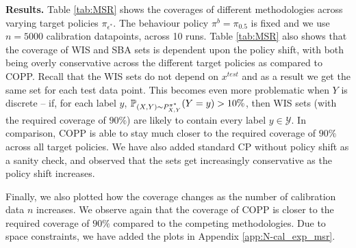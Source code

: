 \textbf{Results.}
Table \ref{tab:MSR} shows the coverages of different methodologies across varying target policies $\pi_{\epsilon^*}$. The behaviour policy $\pi^b = \pi_{0.5}$ is fixed and we use $n=5000$ calibration datapoints, across 10 runs. Table \ref{tab:MSR} also shows that the coverage of WIS and SBA sets is dependent upon the policy shift, with both being overly conservative across the different target policies as compared to COPP. Recall that the WIS sets do not depend on $x^{test}$ and as a result we get the same set for each test data point. This becomes even more problematic when $Y$ is discrete -- if, for each label $y$, $\mathbb{P}_{(X,Y)\sim P^{\pi^*}_{X,Y}}(Y = y)>10\%$, then WIS sets (with the required coverage of $90\%$) are likely to contain every label $y \in \mathcal{Y}$.
In comparison, COPP is able to stay much closer to the required coverage of $90\%$ across all target policies. We have also added standard CP without policy shift as a sanity check, and observed that the sets get increasingly conservative as the policy shift increases.

Finally, we also plotted how the coverage changes as the number of calibration data $n$ increases. We observe again that the coverage of COPP is closer to the required coverage of $90\%$ compared to the competing methodologies. Due to space constraints, we have added the plots in Appendix \ref{app:N-cal_exp_msr}.


